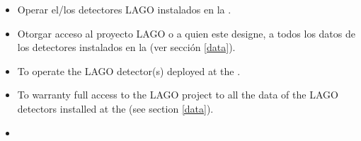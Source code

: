 \begin{itemize}
  \ifes
	\item Operar el/los detectores LAGO instalados en la \institution.
	\item Otorgar acceso al proyecto LAGO o a quien este designe, a todos los datos de los detectores instalados en la \institution (ver sección \ref{data}).
  \fi
  \ifen
	\item To operate the LAGO detector(s) deployed at the \institution. 
	\item To warranty full access to the LAGO project to all the data of the LAGO detectors installed at the \institution (see section \ref{data}). 
  \fi
  \ifpt
    \item
  \fi
\end{itemize}

